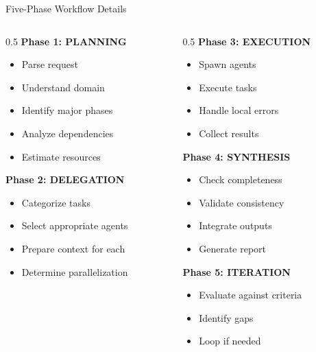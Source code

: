 \documentclass[aspectratio=169,11pt]{beamer}
\begin{document}
\begin{frame}{Five-Phase Workflow Details}
    \begin{columns}[T]
        \begin{column}{0.5\textwidth}
            \textbf{Phase 1: PLANNING}
            \begin{itemize}
                \item Parse request
                \item Understand domain
                \item Identify major phases
                \item Analyze dependencies
                \item Estimate resources
            \end{itemize}

            \vspace{0.2cm}
            \textbf{Phase 2: DELEGATION}
            \begin{itemize}
                \item Categorize tasks
                \item Select appropriate agents
                \item Prepare context for each
                \item Determine parallelization
            \end{itemize}
        \end{column}
        \begin{column}{0.5\textwidth}
            \textbf{Phase 3: EXECUTION}
            \begin{itemize}
                \item Spawn agents
                \item Execute tasks
                \item Handle local errors
                \item Collect results
            \end{itemize}

            \vspace{0.2cm}
            \textbf{Phase 4: SYNTHESIS}
            \begin{itemize}
                \item Check completeness
                \item Validate consistency
                \item Integrate outputs
                \item Generate report
            \end{itemize}

            \vspace{0.2cm}
            \textbf{Phase 5: ITERATION}
            \begin{itemize}
                \item Evaluate against criteria
                \item Identify gaps
                \item Loop if needed
            \end{itemize}
        \end{column}
    \end{columns}
\end{frame}
\end{document}
